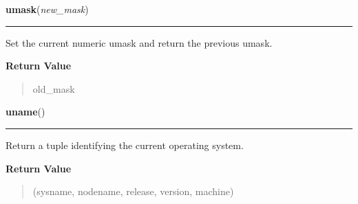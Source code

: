     \label{os:umask}

    \vspace{0.5ex}

\hspace{.8\funcindent}\begin{boxedminipage}{\funcwidth}

    \raggedright \textbf{umask}(\textit{new\_mask})

    \vspace{-1.5ex}

    \rule{\textwidth}{0.5\fboxrule}
\setlength{\parskip}{2ex}
    Set the current numeric umask and return the previous umask.

\setlength{\parskip}{1ex}
      \textbf{Return Value}
    \vspace{-1ex}

      \begin{quote}
      old\_mask

      \end{quote}

    \end{boxedminipage}

    \label{os:uname}

    \vspace{0.5ex}

\hspace{.8\funcindent}\begin{boxedminipage}{\funcwidth}

    \raggedright \textbf{uname}()

    \vspace{-1.5ex}

    \rule{\textwidth}{0.5\fboxrule}
\setlength{\parskip}{2ex}
    Return a tuple identifying the current operating system.

\setlength{\parskip}{1ex}
      \textbf{Return Value}
    \vspace{-1ex}

      \begin{quote}
      (sysname, nodename, release, version, machine)

      \end{quote}

    \end{boxedminipage}

    \label{os:unlink}

    \vspace{0.5ex}

